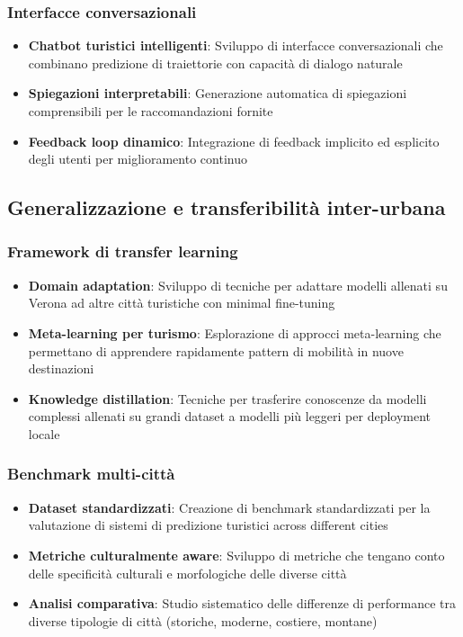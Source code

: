 \subsubsection{Interfacce conversazionali}
\begin{itemize}
\item \textbf{Chatbot turistici intelligenti}: Sviluppo di interfacce conversazionali che combinano predizione di traiettorie con capacità di dialogo naturale
\item \textbf{Spiegazioni interpretabili}: Generazione automatica di spiegazioni comprensibili per le raccomandazioni fornite
\item \textbf{Feedback loop dinamico}: Integrazione di feedback implicito ed esplicito degli utenti per miglioramento continuo
\end{itemize}

\subsection{Generalizzazione e transferibilità inter-urbana}

\subsubsection{Framework di transfer learning}
\begin{itemize}
\item \textbf{Domain adaptation}: Sviluppo di tecniche per adattare modelli allenati su Verona ad altre città turistiche con minimal fine-tuning
\item \textbf{Meta-learning per turismo}: Esplorazione di approcci meta-learning che permettano di apprendere rapidamente pattern di mobilità in nuove destinazioni
\item \textbf{Knowledge distillation}: Tecniche per trasferire conoscenze da modelli complessi allenati su grandi dataset a modelli più leggeri per deployment locale
\end{itemize}

\subsubsection{Benchmark multi-città}
\begin{itemize}
\item \textbf{Dataset standardizzati}: Creazione di benchmark standardizzati per la valutazione di sistemi di predizione turistici across different cities
\item \textbf{Metriche culturalmente aware}: Sviluppo di metriche che tengano conto delle specificità culturali e morfologiche delle diverse città
\item \textbf{Analisi comparativa}: Studio sistematico delle differenze di performance tra diverse tipologie di città (storiche, moderne, costiere, montane)
\end{itemize}


